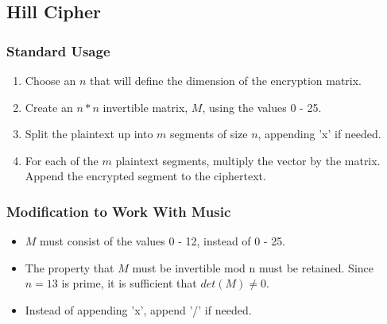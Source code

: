 \documentclass[14pt]{article}
\begin{document}
	\subsection{Hill Cipher}
        \subsubsection{Standard Usage}
            \begin{enumerate}
                \item Choose an $n$ that will define the dimension of the encryption matrix.
                \item Create an $n * n$ invertible matrix, $M$, using the values 0 - 25.
                \item Split the plaintext up into $m$ segments of size $n$, appending 'x' if needed.
                \item For each of the $m$ plaintext segments, multiply the vector by the matrix. Append the encrypted segment to the ciphertext.
            \end{enumerate}
            \cite{Trappe}

    	\subsubsection{Modification to Work With Music}
            \begin{itemize}
                \item $M$ must consist of the values 0 - 12, instead of 0 - 25.
                \item The property that $M$ must be invertible mod n must be retained. Since $n = 13$ is prime, it is sufficient that $det(M) \neq 0$.
                \item Instead of appending 'x', append '/' if needed.
            \end{itemize}
    
\end{document}
